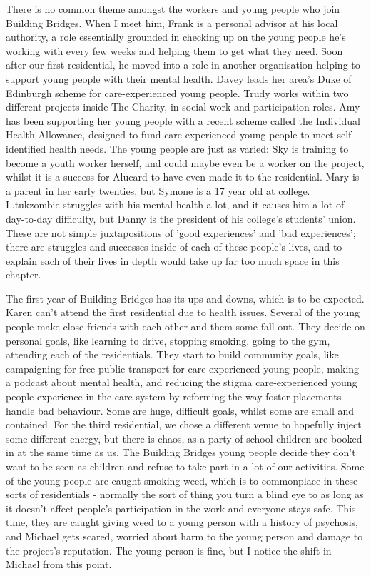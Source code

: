 There is no common theme amongst the workers and young people who join Building Bridges. When I meet him, Frank is a personal advisor at his local authority, a role essentially grounded in checking up on the young people he's working with every few weeks and helping them to get what they need. Soon after our first residential, he moved into a role in another organisation helping to support young people with their mental health. Davey leads her area's Duke of Edinburgh scheme for care-experienced young people. Trudy works within two different projects inside The Charity, in social work and participation roles. Amy has been supporting her young people with a recent scheme called the Individual Health Allowance, designed to fund care-experienced young people to meet self-identified health needs. The young people are just as varied: Sky is training to become a youth worker herself, and could maybe even be a worker on the project, whilst it is a success for Alucard to have even made it to the residential. Mary is a parent in her early twenties, but Symone is a 17 year old at college. L.tukzombie struggles with his mental health a lot, and it causes him a lot of day-to-day difficulty, but Danny is the president of his college's students' union. These are not simple juxtapositions of 'good experiences' and 'bad experiences'; there are struggles and successes inside of each of these people's lives, and to explain each of their lives in depth would take up far too much space in this chapter. 

The first year of Building Bridges has its ups and downs, which is to be expected. Karen can't attend the first residential due to health issues. Several of the young people make close friends with each other and them some fall out. They decide on personal goals, like learning to drive, stopping smoking, going to the gym, attending each of the residentials. They start to build community goals, like campaigning for free public transport for care-experienced young people, making a podcast about mental health, and reducing the stigma care-experienced young people experience in the care system by reforming the way foster placements handle bad behaviour. Some are huge, difficult goals, whilst some are small and contained. For the third residential, we chose a different venue to hopefully inject some different energy, but there is chaos, as a party of school children are booked in at the same time as us.  The Building Bridges young people decide they don't want to be seen as children and refuse to take part in a lot of our activities. Some of the young people are caught smoking weed, which is to commonplace in these sorts of residentials - normally the sort of thing you turn a blind eye to as long as it doesn't affect people's participation in the work and everyone stays safe. This time, they are caught giving weed to a young person with a history of psychosis, and Michael gets scared, worried about harm to the young person and damage to the project's reputation. The young person is fine, but I notice the shift in Michael from this point.

